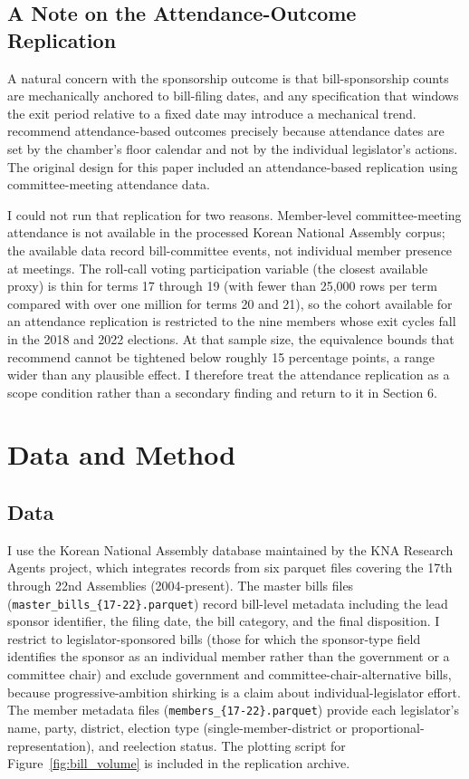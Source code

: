 \documentclass[11pt]{article}
\begin{document}
\subsection{A Note on the Attendance-Outcome Replication}

A natural concern with the sponsorship outcome is that bill-sponsorship counts are mechanically anchored to bill-filing dates, and any specification that windows the exit period relative to a fixed date may introduce a mechanical trend. \citet{hoyland2017} recommend attendance-based outcomes precisely because attendance dates are set by the chamber's floor calendar and not by the individual legislator's actions. The original design for this paper included an attendance-based replication using committee-meeting attendance data.

I could not run that replication for two reasons. Member-level committee-meeting attendance is not available in the processed Korean National Assembly corpus; the available data record bill-committee events, not individual member presence at meetings. The roll-call voting participation variable (the closest available proxy) is thin for terms 17 through 19 (with fewer than 25,000 rows per term compared with over one million for terms 20 and 21), so the cohort available for an attendance replication is restricted to the nine members whose exit cycles fall in the 2018 and 2022 elections. At that sample size, the equivalence bounds that \citet{titiunikfeher2017} recommend cannot be tightened below roughly 15 percentage points, a range wider than any plausible effect. I therefore treat the attendance replication as a scope condition rather than a secondary finding and return to it in Section 6.

\section{Data and Method}

\subsection{Data}

I use the Korean National Assembly database maintained by the KNA Research Agents project, which integrates records from six parquet files covering the 17th through 22nd Assemblies (2004-present). The master bills files (\texttt{master\_bills\_\{17-22\}.parquet}) record bill-level metadata including the lead sponsor identifier, the filing date, the bill category, and the final disposition. I restrict to legislator-sponsored bills (those for which the sponsor-type field identifies the sponsor as an individual member rather than the government or a committee chair) and exclude government and committee-chair-alternative bills, because progressive-ambition shirking is a claim about individual-legislator effort. The member metadata files (\texttt{members\_\{17-22\}.parquet}) provide each legislator's name, party, district, election type (single-member-district or proportional-representation), and reelection status. The plotting script for Figure~\ref{fig:bill_volume} is included in the replication archive.
\end{document}
